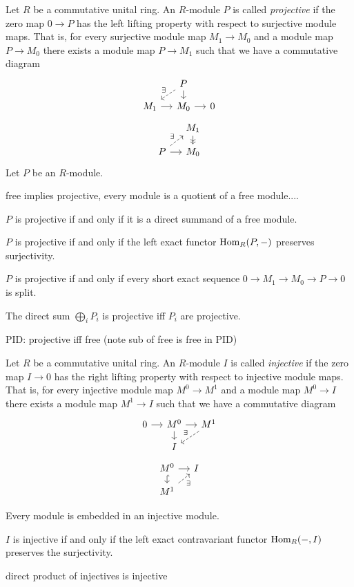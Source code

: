 \documentclass{../../large}
\begin{document}
\begin{prb}
Let $R$ be a commutative unital ring.
An $R$-module $P$ is called \emph{projective} if the zero map $0\to P$ has the left lifting property with respect to surjective module maps.
That is, for every surjective module map $M_1\to M_0$ and a module map $P\to M_0$ there exists a module map $P\to M_1$ such that we have a commutative diagram
\[\begin{tikzcd}[sep=small]
&P\dar\ar[dashed,swap]{dl}{\exists}&\\
M_1\rar&M_0\rar&0
\end{tikzcd}\]
\[\begin{tikzcd}[sep=small]
&M_1\dar[->>]\\
P\rar\ar[dashed]{ur}{\exists}&M_0
\end{tikzcd}\]
Let $P$ be an $R$-module.

free implies projective, every module is a quotient of a free module....
\begin{parts}
\item $P$ is projective if and only if it is a direct summand of a free module.
\item $P$ is projective if and only if the left exact functor $\operatorname{Hom}_R(P,-)$ preserves surjectivity.
\item $P$ is projective if and only if every short exact sequence $0\to M_1\to M_0\to P\to0$ is split.
\item The direct sum $\bigoplus_iP_i$ is projective iff $P_i$ are projective.
\end{parts}
\end{prb}

PID: projective iff free (note sub of free is free in PID)

\begin{prb}
Let $R$ be a commutative unital ring.
An $R$-module $I$ is called \emph{injective} if the zero map $I\to0$ has the right lifting property with respect to injective module maps.
That is, for every injective module map $M^0\to M^1$ and a module map $M^0\to I$ there exists a module map $M^1\to I$ such that we have a commutative diagram
\[\begin{tikzcd}[sep=small]
0\rar&M^0\dar\rar&M^1\ar[dashed,swap]{dl}{\exists}\\
&I&
\end{tikzcd}\]
\[\begin{tikzcd}[sep=small]
M^0\rar\dar[hook]&I\\
M^1\ar[dashed,swap]{ur}{\exists}&
\end{tikzcd}\]
\begin{parts}
\item 
\item Every module is embedded in an injective module.
\item $I$ is injective if and only if the left exact contravariant functor $\operatorname{Hom}_R(-,I)$ preserves the surjectivity.
\item direct product of injectives is injective
\end{parts}
\end{prb}
\end{document}
